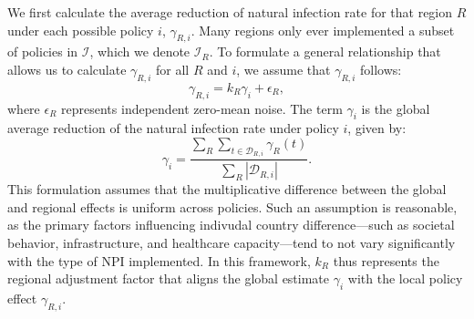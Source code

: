 \documentclass[msom,blindrev]{informs3} %
\begin{document}
We first calculate the average reduction of natural infection rate for that region $R$ under each possible policy $i$, $\gamma_{R,i}$. Many regions only ever implemented a subset of policies in $\mathcal{I}$, which we denote $\mathcal{I}_R$. To formulate a general relationship that allows us to calculate $\gamma_{R,i}$ for all $R$ and $i$, we assume that
$\gamma_{R,i}$ follows:
\begin{equation}
    \gamma_{R,i} = k_R \gamma_i + \epsilon_R, \label{eq:uobsgamma}
\end{equation}
where $\epsilon_R$ represents independent zero-mean noise. The term $\gamma_i$ is the global average reduction of the natural infection rate under policy $i$, given by:
\begin{equation}
    \gamma_i = \frac{\sum_{R} \sum_{t \in \mathcal{D}_{R,i}} \gamma_{R}(t)}{\sum_{R} |\mathcal{D}_{R,i}|}.
\end{equation}
This formulation assumes that the multiplicative difference between the global and regional effects is uniform across policies. Such an assumption is reasonable, as the primary factors influencing indivudal country difference—such as societal behavior, infrastructure, and healthcare capacity—tend to not vary significantly with the type of NPI implemented. In this framework, $k_R$ thus represents the regional adjustment factor that aligns the global estimate $\gamma_i$ with the local policy effect $\gamma_{R,i}$. 
\end{document}
